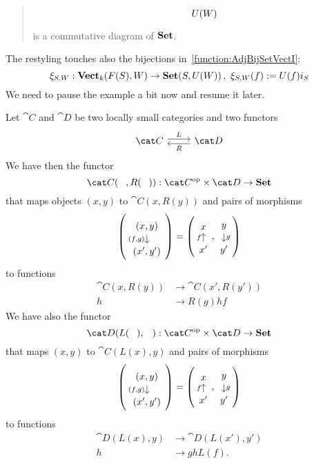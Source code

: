 \begin{example}
\begin{quotation}
\begin{equation}
\begin{tikzcd}
        & U(W)
      \end{tikzcd}\label{diagram:FunctionsExtendsToALinearMapII}\end{equation}
    is a commutative diagram of \(\mathbf{Set}\).
  \end{quotation}
%
  The restyling touches also the bijections
  in~\eqref{function:AdjBijSetVectI}:
  \begin{equation}\xi_{S,W} : \mathbf{Vect}_k(F(S), W) \to \mathbf{Set}(S, U(W)) \,,\
    \xi_{S,W}(f) :=
    U(f)i_S \label{function:AdjBijSetVectII}\end{equation}
  We need to pause the example a bit now and resume it later.
\end{example}

\begin{construction}
  Let \(\cat C\) and \(\cat D\) be two locally small categories and
  two functors
  \[\begin{tikzcd} \cat C \ar["L", r, shift left] & \cat D \ar["R", l,
      shift left] \end{tikzcd}\] We have then the functor
  \[\cat C(\hole, R(\hole)) : \opcat C \times \cat D \to \Set\]
  that maps objects \((x, y)\) to \(\cat C(x, R(y))\) and pairs of
  morphisms
  \[\left(\begin{tikzcd}[row sep=small](x, y) \ar["{(f, g)}", d, swap]
        \\ (x', y')\end{tikzcd}\right) = \left(\begin{tikzcd}[row
        sep=small]x \\ x' \ar["f", u]\end{tikzcd}, \begin{tikzcd}[row
        sep=small]y \ar["g", d] \\ y'\end{tikzcd}\right)\] to
  functions
  \[\begin{aligned}
    \cat C(x, R(y)) &\to \cat C(x', R(y')) \\
    h &\to R(g) h f
  \end{aligned}\]
We have also the functor
\[\cat D(L(\hole), \hole) : \opcat C \times \cat D \to \Set\]
that maps \((x, y)\) to \(\cat C(L(x), y)\) and pairs of morphisms
\[\left(\begin{tikzcd}[row sep=small](x, y) \ar["{(f, g)}", d, swap]
      \\ (x', y')\end{tikzcd}\right) = \left(\begin{tikzcd}[row
      sep=small]x \\ x' \ar["f", u]\end{tikzcd}, \begin{tikzcd}[row
      sep=small]y \ar["g", d] \\ y'\end{tikzcd}\right)\] to functions
\[\begin{aligned}
  \cat D(L(x), y) &\to \cat D(L(x'), y') \\
  h &\to g h L(f) .
\end{aligned}\]
\end{construction}

